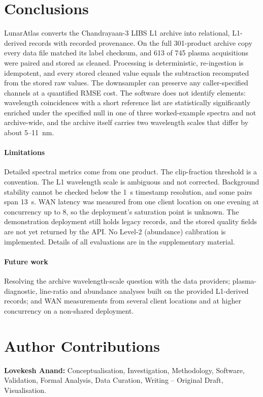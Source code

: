 \documentclass[final,5p,twocolumn,a4paper]{elsarticle}
\begin{document}
\section{Conclusions}

LunarAtlas converts the Chandrayaan-3 LIBS L1 archive into relational, L1-derived records with recorded provenance. On the full 301-product archive copy every data file matched its label checksum, and 613 of 745 plasma acquisitions were paired and stored as cleaned. Processing is deterministic, re-ingestion is idempotent, and every stored cleaned value equals the subtraction recomputed from the stored raw values. The downsampler can preserve any caller-specified channels at a quantified RMSE cost. The software does not identify elements: wavelength coincidences with a short reference list are statistically significantly enriched under the specified null in one of three worked-example spectra and not archive-wide, and the archive itself carries two wavelength scales that differ by about 5--11~nm.

\paragraph{Limitations} Detailed spectral metrics come from one product. The clip-fraction threshold is a convention. The L1 wavelength scale is ambiguous and not corrected. Background stability cannot be checked below the 1~s timestamp resolution, and some pairs span 13~s. WAN latency was measured from one client location on one evening at concurrency up to 8, so the deployment's saturation point is unknown. The demonstration deployment still holds legacy records, and the stored quality fields are not yet returned by the API. No Level-2 (abundance) calibration is implemented. Details of all evaluations are in the supplementary material.

\paragraph{Future work} Resolving the archive wavelength-scale question with the data providers; plasma-diagnostic, line-ratio and abundance analyses built on the provided L1-derived records; and WAN measurements from several client locations and at higher concurrency on a non-shared deployment.

\section*{Author Contributions}
\textbf{Lovekesh Anand:} Conceptualisation, Investigation, Methodology, Software, Validation, Formal Analysis, Data Curation, Writing -- Original Draft, Visualisation.
\end{document}

